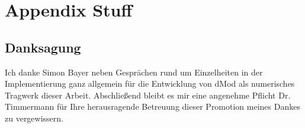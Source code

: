 \chapter{Appendix Stuff} \label{coolestappendix}
\section*{Danksagung}
Ich danke Simon Bayer neben Gesprächen rund um Einzelheiten in der Implementierung ganz allgemein für die Entwicklung von dMod als numerisches Tragwerk dieser Arbeit.
Abschließend bleibt es mir eine angenehme Pflicht Dr. Timmermann für Ihre herausragende Betreuung dieser Promotion meines Dankes zu vergewissern.

